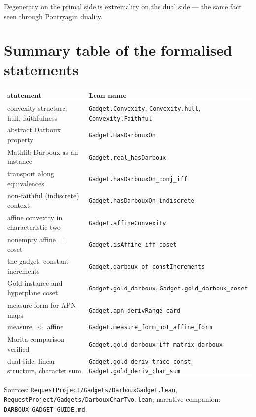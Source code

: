 \documentclass[11pt]{article}
\newcommand{\lean}[1]{\texttt{\small #1}}
\theoremstyle{definition}
\theoremstyle{plain}
\begin{document}
Degeneracy on the primal side is extremality on the dual side --- the same fact seen through
Pontryagin duality.

\section{Summary table of the formalised statements}

\begin{center}
\begin{tabular}{@{}p{6.2cm}p{8.4cm}@{}}
\toprule
statement & Lean name \\
\midrule
convexity structure, hull, faithfulness & \lean{Gadget.Convexity}, \lean{Convexity.hull}, \lean{Convexity.Faithful} \\
abstract Darboux property & \lean{Gadget.HasDarbouxOn} \\
Mathlib Darboux as an instance & \lean{Gadget.real\_hasDarboux} \\
transport along equivalences & \lean{Gadget.hasDarbouxOn\_conj\_iff} \\
non-faithful (indiscrete) context & \lean{Gadget.hasDarbouxOn\_indiscrete} \\
affine convexity in characteristic two & \lean{Gadget.affineConvexity} \\
nonempty affine $=$ coset & \lean{Gadget.isAffine\_iff\_coset} \\
the gadget: constant increments & \lean{Gadget.darboux\_of\_constIncrements} \\
Gold instance and hyperplane coset & \lean{Gadget.gold\_darboux}, \lean{Gadget.gold\_darboux\_coset} \\
measure form for APN maps & \lean{Gadget.apn\_derivRange\_card} \\
measure $\not\Rightarrow$ affine & \lean{Gadget.measure\_form\_not\_affine\_form} \\
Morita comparison verified & \lean{Gadget.gold\_darboux\_iff\_matrix\_darboux} \\
dual side: linear structure, character sum & \lean{Gadget.gold\_deriv\_trace\_const}, \lean{Gadget.gold\_deriv\_char\_sum} \\
\bottomrule
\end{tabular}
\end{center}

\vspace{1em}
\noindent
Sources: \lean{RequestProject/Gadgets/DarbouxGadget.lean},
\lean{RequestProject/Gadgets/DarbouxCharTwo.lean}; narrative companion:
\lean{DARBOUX\_GADGET\_GUIDE.md}.
\end{document}
